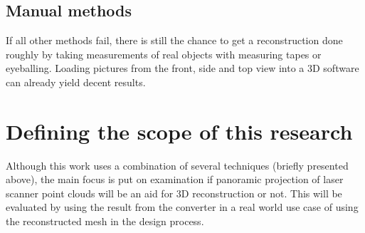 \subsection{Manual methods}

If all other methods fail, there is still the chance to get a reconstruction done roughly by taking measurements of real objects with measuring tapes or eyeballing. Loading pictures from the front, side and top view into a 3D software can already yield decent results.

\section{Defining the scope of this research}

Although this work uses a combination of several techniques (briefly presented above), the main focus is put on examination if panoramic projection of laser scanner point clouds will be an aid for 3D reconstruction or not. This will be evaluated by using the result from the converter in a real world use case of using the reconstructed mesh in the design process.